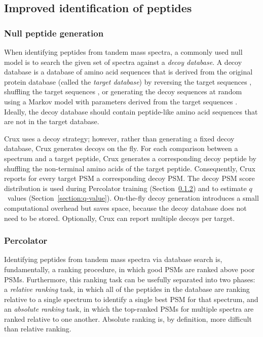 \documentclass[12pt]{article}
\begin{document}
\subsection{Improved identification of peptides}

\subsubsection{Null peptide generation}

When identifying peptides from tandem mass spectra, a commonly used
null model is to search the given set of spectra against a {\em decoy
database}.  A decoy database is a database of amino acid sequences
that is derived from the original protein database (called the {\em
target database}) by reversing the target sequences
\cite{moore:qscore}, shuffling the target sequences
\cite{klammer:effects}, or generating the decoy sequences at random
using a Markov model with parameters derived from the target sequences
\cite{colinge:olav}.  Ideally, the decoy database should contain
peptide-like amino acid sequences that are not in the target database.

Crux uses a decoy strategy; however, rather than generating a fixed
decoy database, Crux generates decoys on the fly.  For each comparison
between a spectrum and a target peptide, Crux generates a
corresponding decoy peptide by shuffling the non-terminal amino acids
of the target peptide.  Consequently, Crux reports for every target
PSM a corresponding decoy PSM.  The decoy PSM score distribution is
used during Percolator training (Section~\ref{section:percolator}) and
to estimate $q$~values (Section~\ref{section:q-value}).  On-the-fly
decoy generation introduces a small computational overhead but saves
space, because the decoy database does not need to be stored.
Optionally, Crux can report multiple decoys per target.

\subsubsection{Percolator}
\label{section:percolator}

Identifying peptides from tandem mass spectra via database search is,
fundamentally, a ranking procedure, in which good PSMs are ranked
above poor PSMs.  Furthermore, this ranking task can be usefully
separated into two phases: a {\em relative ranking} task, in which all
of the peptides in the database are ranking relative to a single
spectrum to identify a single best PSM for that spectrum, and an {\em
absolute ranking} task, in which the top-ranked PSMs for multiple
spectra are ranked relative to one another.  Absolute ranking is, by
definition, more difficult than relative ranking.
\end{document}

